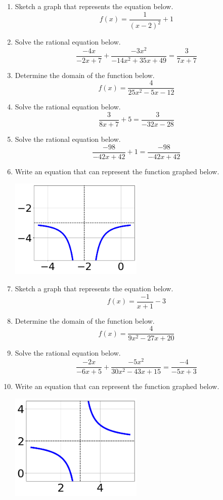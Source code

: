 \documentclass[14pt]{extbook}
\begin{document}
\begin{enumerate}
{\begin{center}
\end{center}
} \newpage
\item{
Sketch a graph that represents the equation below.\[ f(x) = \frac{1}{(x - 2)^2} + 1 \]} \newpage
\item{
Solve the rational equation below.\[ \frac{-4x}{-2x + 7} + \frac{-3x^{2}}{-14x^{2} +35 x + 49} = \frac{3}{7x + 7} \]} \newpage
\item{
Determine the domain of the function below.\[ f(x) = \frac{4}{25x^{2} -5 x -12} \]} \newpage
\item{
Solve the rational equation below.\[ \frac{3}{8x + 7} + 5 = \frac{3}{-32x -28} \]} \newpage
\item{
Solve the rational equation below.\[ \frac{-98}{-42x + 42} + 1 = \frac{-98}{-42x + 42} \]} \newpage
\item{
Write an equation that can represent the function graphed below.
\begin{center}
    \includegraphics[width=0.5\textwidth]{../Figures/rationalGraphToEquationB.png}
\end{center}
} \newpage
\item{
Sketch a graph that represents the equation below.\[ f(x) = \frac{-1}{x + 1} - 3 \]} \newpage
\item{
Determine the domain of the function below.\[ f(x) = \frac{4}{9x^{2} -27 x + 20} \]} \newpage
\item{
Solve the rational equation below.\[ \frac{-2x}{-6x + 5} + \frac{-5x^{2}}{30x^{2} -43 x + 15} = \frac{-4}{-5x + 3} \]} \newpage
\item{
Write an equation that can represent the function graphed below.
\begin{center}
    \includegraphics[width=0.5\textwidth]{../Figures/rationalGraphToEquationCopyB.png}

\end{center}}
\end{enumerate}
\end{document}
